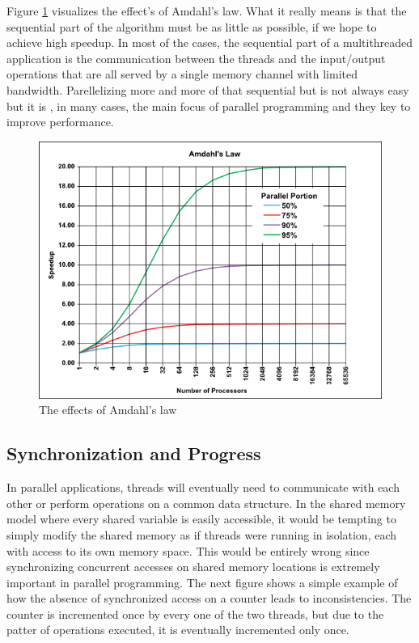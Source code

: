 Figure \ref{Amdahls_law} visualizes the effect's of Amdahl's law. What it really means is that the sequential part of the algorithm must be as little as possible, if we hope to achieve high speedup. In most of the cases, the sequential part of a multithreaded application is the communication between the threads and the input/output operations that are all served by a single memory channel with limited bandwidth. Parellelizing more and more of that sequential but is not always easy but it is , in many cases, the main focus of parallel programming and they key to improve performance. 
\begin{figure} 
 \centering 
  \includegraphics[scale=0.5]{Amdahls_law.png} 
\caption{The effects of Amdahl's law} 
\label{Amdahls_law} 
\end{figure} 

\subsection{Synchronization and Progress}

In parallel applications, threads will eventually need to communicate with each other or perform operations on a common data structure. In the shared memory model where every shared variable is easily accessible, it would be tempting to simply modify the shared memory as if threads were running in isolation, each with access to its own memory space. This would be entirely wrong since synchronizing concurrent accesses on shared memory locations is extremely important in parallel programming. The next figure shows a simple example of how the absence of synchronized access on a counter leads to inconsistencies. The counter is incremented once by every one of the two threads, but due to the patter of operations executed, it is eventually incremented only once.

